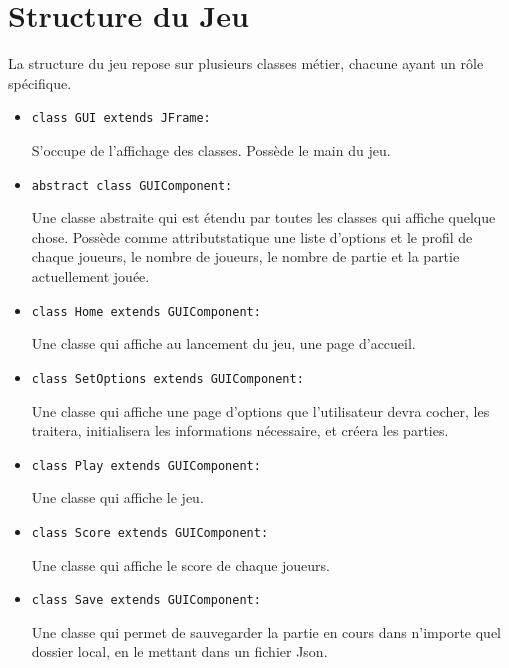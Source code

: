 \documentclass{article}
\begin{document}
\section{Structure du Jeu}
La structure du jeu repose sur plusieurs classes métier, chacune ayant un rôle spécifique. 
\begin{itemize}
\item 
\begin{verbatim} 
class GUI extends JFrame:
\end{verbatim}
S'occupe de l'affichage des classes. Possède le main du jeu.

\item
\begin{verbatim}
abstract class GUIComponent:
\end{verbatim}
Une classe abstraite qui est étendu par toutes les classes qui affiche quelque chose. Possède comme attributstatique une liste d'options et le profil de chaque joueurs, le nombre de joueurs, le nombre de partie et la partie actuellement jouée.

\item
\begin{verbatim}
class Home extends GUIComponent:
\end{verbatim}
Une classe qui affiche au lancement du jeu, une page d'accueil.

\item
\begin{verbatim}
class SetOptions extends GUIComponent:
\end{verbatim}
Une classe qui affiche une page d'options que l'utilisateur devra cocher, les traitera, initialisera les informations nécessaire, et créera les parties.

\item
\begin{verbatim}
class Play extends GUIComponent:
\end{verbatim}
Une classe qui affiche le jeu.

\item
\begin{verbatim}
class Score extends GUIComponent:
\end{verbatim}
Une classe qui affiche le score de chaque joueurs.

\item
\begin{verbatim}
class Save extends GUIComponent:
\end{verbatim}
Une classe qui permet de sauvegarder la partie en cours dans n'importe quel dossier local, en le mettant dans un fichier Json.


\end{itemize}
\end{document}
